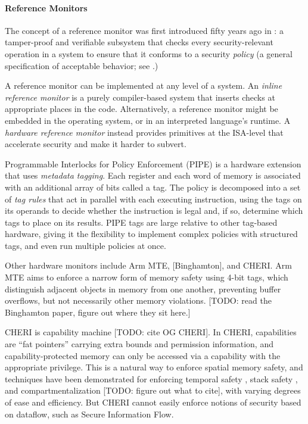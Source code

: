 \documentclass{llncs}
\begin{document}
\paragraph{Reference Monitors}

The concept of a reference monitor was first introduced fifty years ago in \cite{Anderson72:PlanningStudy}:
a tamper-proof and verifiable subsystem that checks every security-relevant operation in a system to
ensure that it conforms to a security {\em policy} (a general specification of acceptable behavior;
see \cite{Goguen82:SecurityPolicies}.)

A reference monitor can be implemented at any level of a system. An {\em inline reference monitor}
is a purely compiler-based system that inserts checks at appropriate places in the code.
Alternatively, a reference monitor might be embedded in the operating system, or in an interpreted
language's runtime. A {\em hardware reference monitor} instead provides primitives at the ISA-level
that accelerate security and make it harder to subvert.

Programmable Interlocks for Policy Enforcement (PIPE) \cite{Dhawan14:PUMP} is a hardware extension
that uses {\em metadata tagging}. Each register and each word of memory is associated with
an additional array of bits called a tag. The policy is decomposed into a set of {\em tag rules}
that act in parallel with each executing instruction, using the tags on its operands to
decide whether the instruction is legal and, if so, determine which tags to place on its results.
PIPE tags are large relative to other tag-based hardware, giving it the flexibility
to implement complex policies with structured tags, and even run multiple policies at once.

Other hardware monitors include Arm MTE, [Binghamton], and CHERI.
Arm MTE aims to enforce a narrow form of memory safety using 4-bit tags, which distinguish adjacent objects
in memory from one another, preventing buffer overflows, but not necessarily other memory violations.
[TODO: read the Binghamton paper, figure out where they sit here.] 

CHERI is capability machine [TODO: cite OG CHERI]. In CHERI, capabilities
are ``fat pointers'' carrying extra bounds and permission information, and capability-protected
memory can only be accessed via a capability with the appropriate privilege. This is a natural
way to enforce spatial memory safety, and techniques have been demonstrated for enforcing
temporal safety \cite{NWF20:Cornucopia}, stack safety \cite{Skorstengaard19:stktokens},
and compartmentalization [TODO: figure out what to cite], with varying degrees of ease and
efficiency. But CHERI cannot easily enforce notions of security based on dataflow,
such as Secure Information Flow.
\end{document}

